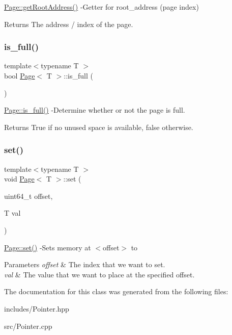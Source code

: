 \hyperlink{class_page_a438a928e0ce67dc404f183678eb533ec}{Page\+::get\+Root\+Address()} -\/\+Getter for root\+\_\+address (page index) \begin{DoxyReturn}{Returns}
The address / index of the page. 
\end{DoxyReturn}
\mbox{\label{class_page_a8c27abd6fb2ce55c05b065584b4bcc75}} 
\subsubsection{\texorpdfstring{is\+\_\+full()}{is\_full()}}
{\footnotesize\ttfamily template$<$typename T $>$ \\
bool \hyperlink{class_page}{Page}$<$ T $>$\+::is\+\_\+full (\begin{DoxyParamCaption}{ }\end{DoxyParamCaption})}

\hyperlink{class_page_a8c27abd6fb2ce55c05b065584b4bcc75}{Page\+::is\+\_\+full()} -\/\+Determine whether or not the page is full. \begin{DoxyReturn}{Returns}
True if no unused space is available, false otherwise. 
\end{DoxyReturn}
\mbox{\label{class_page_a4de67b2afdfe14758388f745a8a99d56}} 
\subsubsection{\texorpdfstring{set()}{set()}}
{\footnotesize\ttfamily template$<$typename T $>$ \\
void \hyperlink{class_page}{Page}$<$ T $>$\+::set (\begin{DoxyParamCaption}\item[{uint64\+\_\+t}]{offset,  }\item[{T}]{val }\end{DoxyParamCaption})}

\hyperlink{class_page_a4de67b2afdfe14758388f745a8a99d56}{Page\+::set()} -\/\+Sets memory at $<$offset$>$ to 


\begin{DoxyParams}{Parameters}
{\em offset} & The index that we want to set. \\
\hline
{\em val} & The value that we want to place at the specified offset. \\
\hline
\end{DoxyParams}


The documentation for this class was generated from the following files\+:\begin{DoxyCompactItemize}
\item 
includes/Pointer.\+hpp\item 
src/Pointer.\+cpp\end{DoxyCompactItemize}
